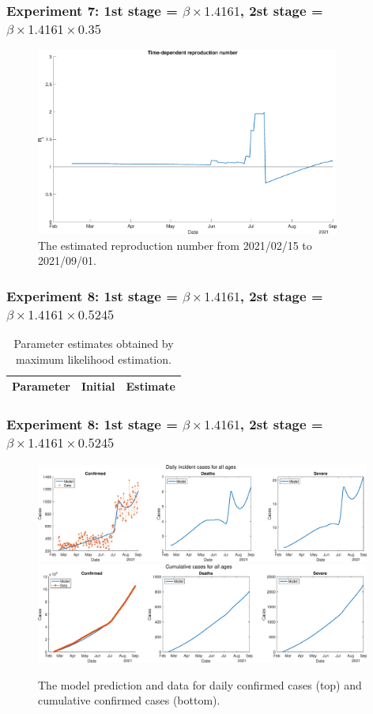 \documentclass[aspectratio=169, 9pt, xcolor=dvipsnames]{beamer}
\begin{document}
	\begin{frame}\frametitle{Experiment 7: 1st stage = $\beta \times 1.4161$, 2st stage = $\beta \times 1.4161 \times 0.35$}
	    \begin{figure}
	    	\centering
	    	\includegraphics[width=10cm]{../results/estimate_sd_1st_2_2nd_3/rep_num.eps}
	    	\caption{The estimated reproduction number from 2021/02/15 to 2021/09/01.}
	    \end{figure}
	\end{frame}

	\begin{frame}\frametitle{Experiment 8: 1st stage = $\beta \times 1.4161$, 2st stage = $\beta \times 1.4161 \times 0.5245$}
	    \begin{table}
	    	\begin{tabular}{crr}
	    		\toprule
	    		\textbf{Parameter} & \textbf{Initial} & \textbf{Estimate} \\
	    		\midrule
	    		
	    		\bottomrule
	    	\end{tabular}
	    	\caption{Parameter estimates obtained by maximum likelihood estimation.}
	    \end{table}
	\end{frame}

	\begin{frame}\frametitle{Experiment 8: 1st stage = $\beta \times 1.4161$, 2st stage = $\beta \times 1.4161 \times 0.5245$}
	    \begin{figure}
	    	\centering
	    	\includegraphics[width=11cm]{../results/estimate_sd_1st_2_2nd_4/daily_all_age.eps}
	    	\includegraphics[width=11cm]{../results/estimate_sd_1st_2_2nd_4/cumul_all_age.eps}
	    	\caption{The model prediction and data for daily confirmed cases (top) and cumulative confirmed cases (bottom).}
	    \end{figure}
	\end{frame}
\end{document}

